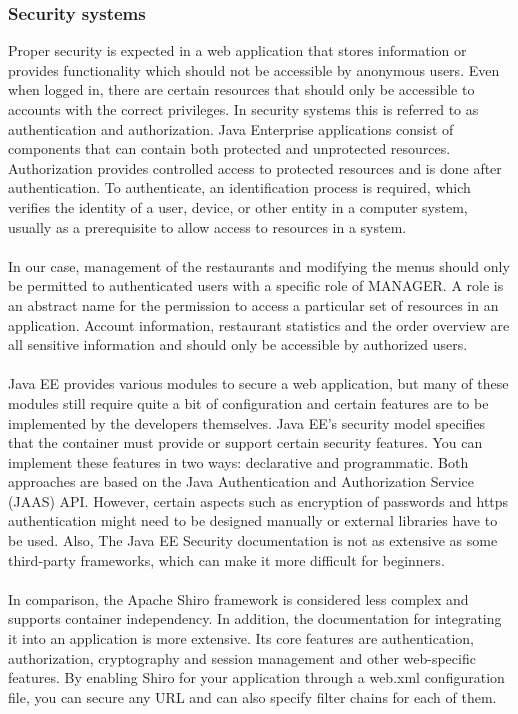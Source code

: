 \documentclass[12pt]{article}
\begin{document}
\begin{multicols}{2}
\subsubsection{Security systems}
Proper security is expected in a web application that stores information or provides functionality which should not be accessible by anonymous users. Even when logged in, there are certain resources that should only be accessible to accounts with the correct privileges. In security systems this is referred to as authentication and authorization. Java Enterprise applications consist of components that can contain both protected and unprotected resources.  Authorization provides controlled access to protected resources and is done after authentication. To authenticate, an identification process is required, which verifies the identity of a user, device, or other entity in a computer system, usually as a prerequisite to allow access to resources in a system.
\\\\
In our case, management of the restaurants and modifying the menus should only be permitted to authenticated users with a specific role of MANAGER. A role is an abstract name for the permission to access a particular set of resources in an application. Account information, restaurant statistics and the order overview are all sensitive information and should only be accessible by authorized users. 
\\\\
Java EE provides various modules to secure a web application, but many of these modules still require quite a bit of configuration and certain features are to be implemented by the developers themselves. \cite{JavaEESecurity29:online} Java EE’s security model specifies that the container must provide or support certain security features. You can implement these features in two ways: declarative and programmatic. Both approaches are based on the Java Authentication and Authorization Service (JAAS) API. However, certain aspects such as encryption of passwords and https authentication might need to be designed manually or external libraries have to be used. Also, The Java EE Security documentation is not as extensive as some third-party frameworks, which can make it more difficult for beginners.
\\\\
In comparison, the Apache Shiro framework is considered less complex and supports container independency. In addition, the documentation for integrating it into an application is more extensive. Its core features are authentication, authorization, cryptography and session management and other web-specific features. By enabling Shiro for your application through a web.xml configuration file, you can secure any URL and can also specify filter chains for each of them. \cite{javaSecurityComparison84:online}

\end{multicols}
\end{document}
